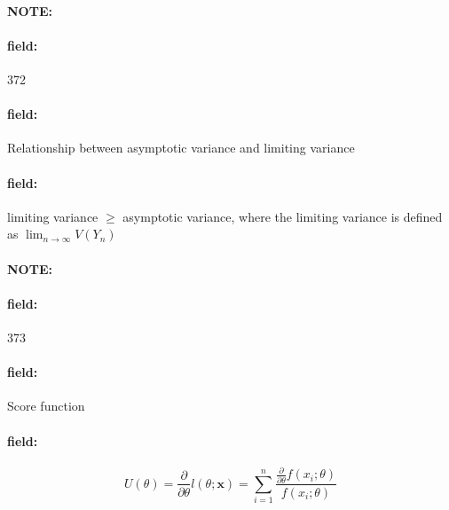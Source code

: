 \documentclass[12pt]{article}
\newenvironment{note}{\paragraph{NOTE:}}{}
\newenvironment{field}{\paragraph{field:}}{}
\begin{document}
\begin{note}
    \begin{field}
        \tiny 372
    \end{field}
    \begin{field}
        Relationship between asymptotic variance and limiting variance
    \end{field}
    \begin{field}
        limiting variance $\geq$ asymptotic variance, where the limiting variance is defined as $\lim_{n \to \infty} V(Y_n)$
    \end{field}
\end{note}

\begin{note}
    \begin{field}
        \tiny 373
    \end{field}
    \begin{field}
        Score function
    \end{field}
    \begin{field}
        $$U(\theta) = \frac{\partial}{\partial \theta} l(\theta;\mathbf{x}) = \sum_{i=1}^n \frac{\frac{\partial}{\partial \theta}f(x_i;\theta)}{f(x_i;\theta)} $$
    \end{field}
\end{note}
\end{document}
